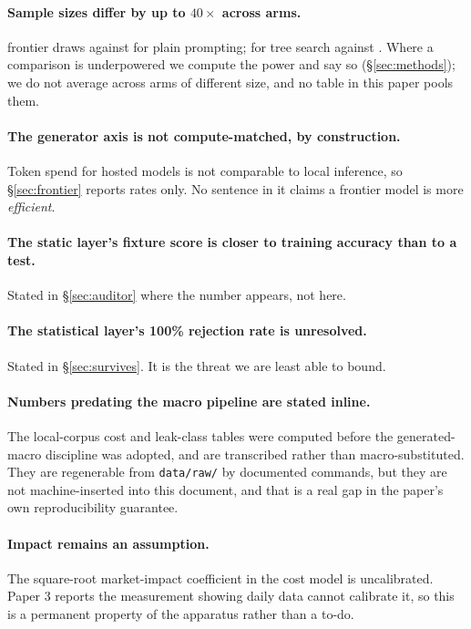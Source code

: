 \documentclass[11pt,a4paper]{article}
\begin{document}
\paragraph{Sample sizes differ by up to $40\times$ across arms.} \aaGvNLarge{} frontier draws
against \pgmPlainDraws{} for plain prompting; \pgmMctsDraws{} for tree search against
\pgmPlainDraws{}. Where a comparison is underpowered we compute the power and say so
(\S\ref{sec:methods}); we do not average across arms of different size, and no table in this paper
pools them.

\paragraph{The generator axis is not compute-matched, by construction.} Token spend for hosted
models is not comparable to local inference, so \S\ref{sec:frontier} reports rates only. No
sentence in it claims a frontier model is more \emph{efficient}.

\paragraph{The static layer's fixture score is closer to training accuracy than to a test.}
Stated in \S\ref{sec:auditor} where the number appears, not here.

\paragraph{The statistical layer's 100\% rejection rate is unresolved.} Stated in
\S\ref{sec:survives}. It is the threat we are least able to bound.

\paragraph{Numbers predating the macro pipeline are stated inline.} The local-corpus cost and
leak-class tables were computed before the generated-macro discipline was adopted, and are
transcribed rather than macro-substituted. They are regenerable from
\texttt{data/raw/} by documented commands, but they are not machine-inserted into this document,
and that is a real gap in the paper's own reproducibility guarantee.

\paragraph{Impact remains an assumption.} The square-root market-impact coefficient in the cost
model is uncalibrated. Paper 3 reports the measurement showing daily data cannot calibrate it, so
this is a permanent property of the apparatus rather than a to-do.
\end{document}
